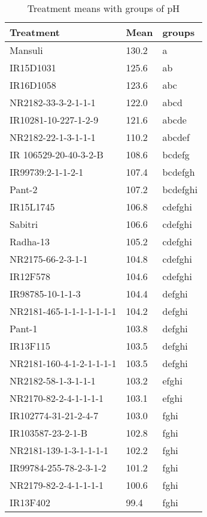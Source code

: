 \documentclass[]{article}
\begin{document}
\begin{longtable}{lll}
\caption{\label{tab:two-fac-groups-tab1}Treatment means with groups of pH}\\
\toprule
Treatment & Mean & groups\\
\midrule
\rowcolor{gray!6}  Mansuli & 130.2 & a\\
IR15D1031 & 125.6 & ab\\
\rowcolor{gray!6}  IR16D1058 & 123.6 & abc\\
NR2182-33-3-2-1-1-1 & 122.0 & abcd\\
\rowcolor{gray!6}  IR10281-10-227-1-2-9 & 121.6 & abcde\\
\addlinespace
NR2182-22-1-3-1-1-1 & 110.2 & abcdef\\
\rowcolor{gray!6}  IR 106529-20-40-3-2-B & 108.6 & bcdefg\\
IR99739:2-1-1-2-1 & 107.4 & bcdefgh\\
\rowcolor{gray!6}  Pant-2 & 107.2 & bcdefghi\\
IR15L1745 & 106.8 & cdefghi\\
\addlinespace
\rowcolor{gray!6}  Sabitri & 106.6 & cdefghi\\
Radha-13 & 105.2 & cdefghi\\
\rowcolor{gray!6}  NR2175-66-2-3-1-1 & 104.8 & cdefghi\\
IR12F578 & 104.6 & cdefghi\\
\rowcolor{gray!6}  IR98785-10-1-1-3 & 104.4 & defghi\\
\addlinespace
NR2181-465-1-1-1-1-1-1-1 & 104.2 & defghi\\
\rowcolor{gray!6}  Pant-1 & 103.8 & defghi\\
IR13F115 & 103.5 & defghi\\
\rowcolor{gray!6}  NR2181-160-4-1-2-1-1-1-1 & 103.5 & defghi\\
NR2182-58-1-3-1-1-1 & 103.2 & efghi\\
\addlinespace
\rowcolor{gray!6}  NR2170-82-2-4-1-1-1-1 & 103.1 & efghi\\
IR102774-31-21-2-4-7 & 103.0 & fghi\\
\rowcolor{gray!6}  IR103587-23-2-1-B & 102.8 & fghi\\
NR2181-139-1-3-1-1-1-1 & 102.2 & fghi\\
\rowcolor{gray!6}  IR99784-255-78-2-3-1-2 & 101.2 & fghi\\
\addlinespace
NR2179-82-2-4-1-1-1-1 & 100.6 & fghi\\
\rowcolor{gray!6}  IR13F402 & 99.4 & fghi\\

\end{longtable}
\end{document}
